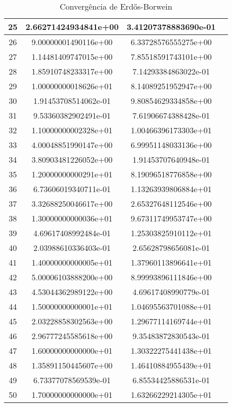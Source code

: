 \begin{table}[H]
\begin{tabular}{|c|c|c|c|}
\hline
25 & 2.66271424934841e+00 &  3.41207378883690e-01 \\ 
\hline
26 & 9.00000001490116e+00 &  6.33728576555275e+00 \\ 
\hline
27 & 1.14481409747015e+00 &  7.85518591743101e+00 \\ 
\hline
28 & 1.85910748233317e+00 &  7.14293384863022e-01 \\ 
\hline
29 & 1.00000000018626e+01 &  8.14089251952947e+00 \\ 
\hline
30 & 1.91453708514062e-01 &  9.80854629334858e+00 \\ 
\hline
31 & 9.53360382902491e-01 &  7.61906674388428e-01 \\ 
\hline
32 & 1.10000000002328e+01 &  1.00466396173303e+01 \\ 
\hline
33 & 4.00048851990147e+00 &  6.99951148033136e+00 \\ 
\hline
34 & 3.80903481226052e+00 &  1.91453707640948e-01 \\ 
\hline
35 & 1.20000000000291e+01 &  8.19096518776858e+00 \\ 
\hline
36 & 6.73606019340711e-01 &  1.13263939806884e+01 \\ 
\hline
37 & 3.32688250046617e+00 &  2.65327648112546e+00 \\ 
\hline
38 & 1.30000000000036e+01 &  9.67311749953747e+00 \\ 
\hline
39 & 4.69617408992484e-01 &  1.25303825910112e+01 \\ 
\hline
40 & 2.03988610336403e-01 &  2.65628798656081e-01 \\ 
\hline
41 & 1.40000000000005e+01 &  1.37960113896641e+01 \\ 
\hline
42 & 5.00006103888200e+00 &  8.99993896111846e+00 \\ 
\hline
43 & 4.53044362989122e+00 &  4.69617408990779e-01 \\ 
\hline
44 & 1.50000000000001e+01 &  1.04695563701088e+01 \\ 
\hline
45 & 2.03228858302563e+00 &  1.29677114169744e+01 \\ 
\hline
46 & 2.96777245585618e+00 &  9.35483872830543e-01 \\ 
\hline
47 & 1.60000000000000e+01 &  1.30322275441438e+01 \\ 
\hline
48 & 1.35891150445607e+00 &  1.46410884955439e+01 \\ 
\hline
49 & 6.73377078569539e-01 &  6.85534425886531e-01 \\ 
\hline
50 & 1.70000000000000e+01 &  1.63266229214305e+01 \\ 
\hline
\end{tabular}
\caption{Convergência de Erdős-Borwein}
\label{table:erdos}
\end{table}